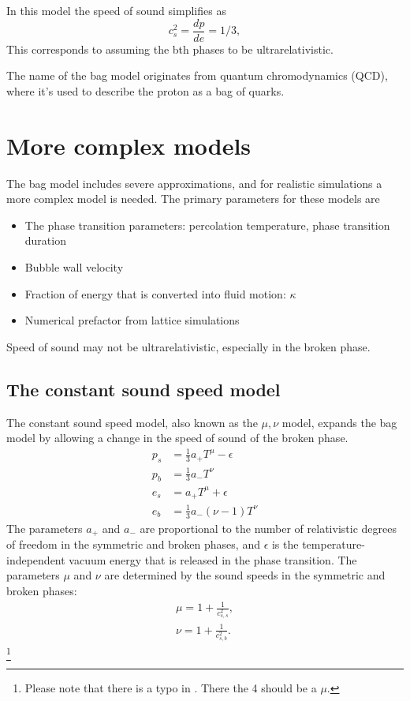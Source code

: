 In this model the speed of sound simplifies as
\begin{equation}
c_s^2 = \frac{dp}{de} = 1/3,
\end{equation}
This corresponds to assuming the bth phases to be ultrarelativistic.

The name of the bag model originates from quantum chromodynamics (QCD), where it's used to describe the proton as a bag of quarks.


\section{More complex models}
The bag model includes severe approximations, and for realistic simulations a more complex model is needed.
The primary parameters for these models are
\begin{itemize}
    \item The phase transition parameters: percolation temperature, phase transition duration
    \item Bubble wall velocity
    \item Fraction of energy that is converted into fluid motion: $\kappa$
    \item Numerical prefactor from lattice simulations
\end{itemize}

Speed of sound may not be ultrarelativistic, especially in the broken phase.

\subsection{The constant sound speed model}
The constant sound speed model, also known as the $\mu, \nu$ model, expands the bag model by allowing a change in the speed of sound of the broken phase.
\cites[eq. 15]{giese_2021}[eq. 38]{giese_2020}
\begin{align}
p_s &= \frac{1}{3} a_+ T^\mu - \epsilon \\
p_b &= \frac{1}{3} a_- T^\nu \\
e_s &= a_+ T^\mu + \epsilon \\
e_b &= \frac{1}{3} a_- (\nu - 1) T^\nu
\end{align}
The parameters $a_+$ and $a_-$ are proportional to the number of relativistic degrees of freedom in the symmetric and broken phases, and $\epsilon$ is the temperature-independent vacuum energy that is released in the phase transition.
The parameters $\mu$ and $\nu$ are determined by the sound speeds in the symmetric and broken phases:
\cites[eq. 16]{giese_2021}[eq. 39]{giese_2020}
\begin{align}
\mu = 1 + \frac{1}{c_{s,s}^2}, \\
\nu = 1 + \frac{1}{c_{s,b}^2}.
\end{align}
\footnote{Please note that there is a typo in \cite[eq. 15]{giese_2021}. There the 4 should be a $\mu$.}


